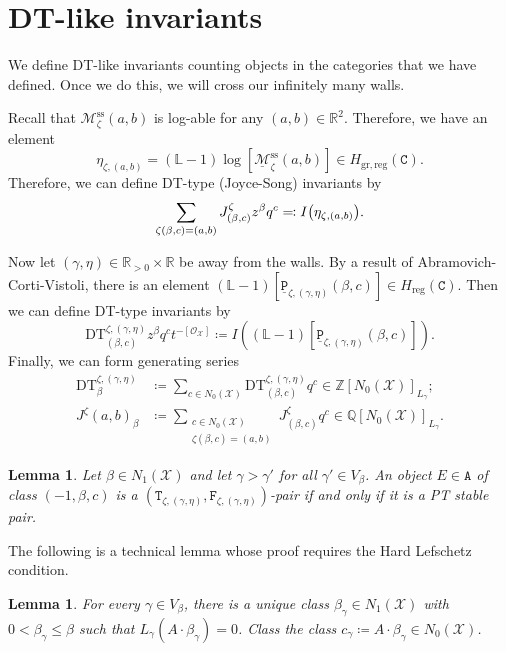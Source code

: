 \documentclass[leqno, openany]{memoir}
\newtheorem{lem}[thm]{Lemma}
\theoremstyle{definition}
\theoremstyle{remark}
\theoremstyle{plain}
\theoremstyle{definition}
\theoremstyle{remark}
\newcommand{\R}{\mathbb{R}}
\newcommand{\Z}{\mathbb{Z}}
\newcommand{\Q}{\mathbb{Q}}
\renewcommand{\L}{\mathbb{L}}
\newcommand{\mc}[1]{\mathcal{#1}}
\newcommand{\mr}[1]{\mathrm{#1}}
\newcommand{\mt}[1]{\mathtt{#1}}
\newcommand{\ul}[1]{\underline{#1}}
\begin{document}
\section{DT-like invariants}

We define DT-like invariants counting objects in the categories that we have defined. Once we do this, we will cross our infinitely many walls.

Recall that $\mc{M}_{\zeta}^{\mr{ss}}(a, b)$ is log-able for any $(a, b) \in \R^2$. Therefore, we have an element
\[ \eta_{\zeta, (a,b)} = (\L-1) \log [\ul{\mc{M}}_{\zeta}^{\mr{ss}}(a,b)] \in H_{\mr{gr, reg}}(\mt{C}). \]
Therefore, we can define DT-type (Joyce-Song) invariants by
\[ \sum_{\zeta(\beta, c) = (a,b)} J_{(\beta,c)}^{\zeta} z^{\beta} q^c \eqqcolon I\qty(\eta_{\zeta,(a,b)}). \]

Now let $(\gamma, \eta) \in \R_{>0} \times \R$ be away from the walls. By a result of Abramovich-Corti-Vistoli, there is an element $(\L-1)[\mt{\ul{P}}_{\zeta,(\gamma,\eta)}(\beta, c)] \in H_{\mr{reg}}(\mt{C})$. Then we can define DT-type invariants by
\[ \mr{DT}_{(\beta,c)}^{\zeta,(\gamma,\eta)}z^{\beta} q^c t^{-[\mc{O}_{\mc{X}}]} \coloneqq I((\L-1)[\mt{\ul{P}}_{\zeta,(\gamma,\eta)}(\beta,c)]). \]
Finally, we can form generating series 
\begin{align*} 
    \mr{DT}_{\beta}^{\zeta, (\gamma,\eta)} &\coloneqq \sum_{c \in N_0(\mc{X})} \mr{DT}_{(\beta,c)}^{\zeta,(\gamma,\eta)} q^c \in \Z[N_0(\mc{X})]_{L_{\gamma}}; \\ 
    J^{\zeta}(a,b)_{\beta} &\coloneqq \sum_{\substack{c \in N_0(\mc{X}) \\ \zeta(\beta,c) = (a,b)}} J^{\zeta}_{(\beta,c)} q^c \in \Q[N_0(\mc{X})]_{L_{\gamma}}. 
\end{align*}

\begin{lem}
    Let $\beta \in N_1(\mc{X})$ and let $\gamma > \gamma'$ for all $\gamma' \in V_{\beta}$. An object $E \in \mt{A}$ of class $(-1, \beta, c)$ is a $(\mt{T}_{\zeta, (\gamma,\eta)}, \mt{F}_{\zeta, (\gamma, \eta)})$-pair if and only if it is a PT stable pair.
\end{lem}

The following is a technical lemma whose proof requires the Hard Lefschetz condition.
\begin{lem}
    For every $\gamma \in V_{\beta}$, there is a unique class $\beta_{\gamma} \in N_1(\mc{X})$ with $0 < \beta_{\gamma} \leq \beta$ such that $L_{\gamma}(A \cdot \beta_{\gamma}) = 0$. Class the class $c_{\gamma} \coloneqq A \cdot \beta_{\gamma} \in N_0(\mc{X})$.
\end{lem}
\end{document}
